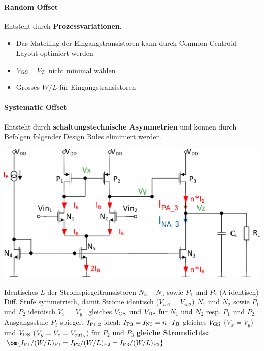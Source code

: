 \paragraph{Random Offset}
Entsteht durch \textbf{Prozessvariationen}.
\begin{itemize}
    \item Das Matching der Eingangstransistoren kann durch Common-Centroid-Layout optimiert werden
    \item $V_{\rm GS} - V_T$ nicht minimal wählen
    \item Grosses $W/L$ für Eingangstransistoren
\end{itemize}


\paragraph{Systematic Offset}
Entsteht durch \textbf{schaltungstechnische Asymmetrien} und können durch Befolgen folgender Design Rules eliminiert werden.

\vspace{-0.2cm}

\begin{center}
    \includegraphics[width=0.8\columnwidth, align=t]{images/09_offset.pdf}
\end{center}

\begin{outline}
    \1 Identisches $L$ der Stromspiegeltransistoren $N_3 - N_5$ sowie $P_1$ und $P_2$ ($\lambda$ identisch)
    \1 Diff. Stufe symmetrisch, damit Ströme identisch ($V_{in1} = V_{in2}$)
        \2 $N_1$ und $N_2$ sowie $P_1$ und $P_2$ identisch
        \2 $V_x$ = $V_y$ \textrightarrow\ gleiches $V_{\rm GS}$ und $V_{\rm DS}$ für $N_1$ und $N_2$ resp. $P_1$ und $P_2$
    \1 Ausgangsstufe $P_3$ spiegelt $I_{\rm P1,2}$ ideal: $I_{\rm P3} = I_{\rm N3} = n \cdot I_B$
        \2 gleiches $V_{\rm GS}$ ($V_x = V_y$) und $V_{\rm DS}$ ($V_y = V_z = V_{\rm out_o}$) für $P_2$ und $P_3$
        \2 \textbf{gleiche Stromdichte:} $\bm{I_{\rm P1} / (W/L)_{\rm P1} = I_{\rm P2} / (W/L)_{\rm P2} = I_{\rm P3} / (W/L)_{\rm P3} }$
\end{outline}

